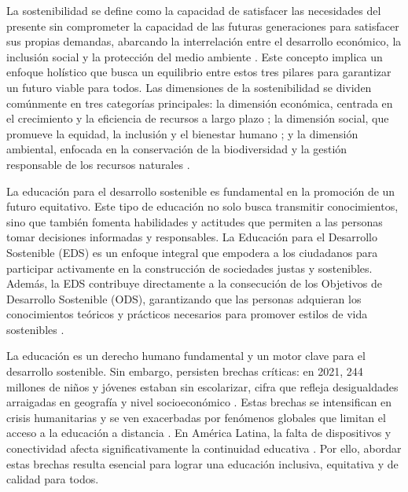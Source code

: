 \introduction

La sostenibilidad se define como la capacidad de satisfacer las necesidades del presente sin comprometer la capacidad de las futuras generaciones para satisfacer sus propias demandas, abarcando la interrelación entre el desarrollo económico, la inclusión social y la protección del medio ambiente \parencite{WCED1987}. Este concepto implica un enfoque holístico que busca un equilibrio entre estos tres pilares para garantizar un futuro viable para todos. Las dimensiones de la sostenibilidad se dividen comúnmente en tres categorías principales: la dimensión económica, centrada en el crecimiento y la eficiencia de recursos a largo plazo \parencite{Stiglitz2009}; la dimensión social, que promueve la equidad, la inclusión y el bienestar humano \parencite{NacionesUnidas2015}; y la dimensión ambiental, enfocada en la conservación de la biodiversidad y la gestión responsable de los recursos naturales \parencite{EuropeanUnion2024}.

La educación para el desarrollo sostenible es fundamental en la promoción de un futuro equitativo. Este tipo de educación no solo busca transmitir conocimientos, sino que también fomenta habilidades y actitudes que permiten a las personas tomar decisiones informadas y responsables. La Educación para el Desarrollo Sostenible (EDS) es un enfoque integral que empodera a los ciudadanos para participar activamente en la construcción de sociedades justas y sostenibles. Además, la EDS contribuye directamente a la consecución de los Objetivos de Desarrollo Sostenible (ODS), garantizando que las personas adquieran los conocimientos teóricos y prácticos necesarios para promover estilos de vida sostenibles \parencite{UNESCO2020EDS}.

La educación es un derecho humano fundamental y un motor clave para el desarrollo sostenible. Sin embargo, persisten brechas críticas: en 2021, 244 millones de niños y jóvenes estaban sin escolarizar, cifra que refleja desigualdades arraigadas en geografía y nivel socioeconómico \parencite{GlobalEduReport2022}. Estas brechas se intensifican en crisis humanitarias y se ven exacerbadas por fenómenos globales que limitan el acceso a la educación a distancia \parencite{UNICEF2022}. En América Latina, la falta de dispositivos y conectividad afecta significativamente la continuidad educativa \parencite{BancoMundial2025}. Por ello, abordar estas brechas resulta esencial para lograr una educación inclusiva, equitativa y de calidad para todos.

